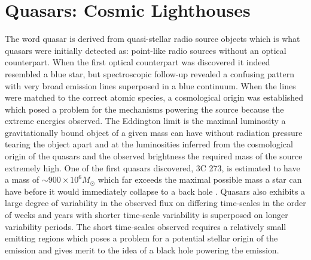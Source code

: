 \clearpage

\section{Quasars: Cosmic Lighthouses}
\label{sec:intro:qso}

The word quasar is derived from quasi-stellar radio source objects which is what
quasars were initially detected as: point-like radio sources without an optical
counterpart. When the first optical counterpart was discovered it indeed
resembled a blue star, but spectroscopic follow-up revealed a confusing pattern
with very broad emission lines superposed in a blue continuum. When the lines
were matched to the correct atomic species, a cosmological origin was
established which posed a problem for the mechanisms powering the source because
the extreme energies observed. The Eddington limit is the maximal luminosity a
gravitationally bound object of a given mass can have without radiation pressure
tearing the object apart and at the luminosities inferred from the cosmological
origin of the quasars and the observed brightness the required mass of the
source extremely high. One of the first quasars discovered, 3C 273, is estimated
to have a mass of $\sim900 \times 10^{6} M_\odot$ \citep{Peterson2004} which far
exceeds the maximal possible mass a star can have before it would immediately
collapse to a back hole \citep{Belczynski2010}. Quasars also exhibits a large
degree of variability in the observed flux on differing time-scales in the order
of weeks and years with shorter time-scale variability is superposed on longer
variability periods. The short time-scales observed requires a relatively small
emitting regions which poses a problem for a potential stellar origin of the
emission and gives merit to the idea of a black hole powering the emission.

